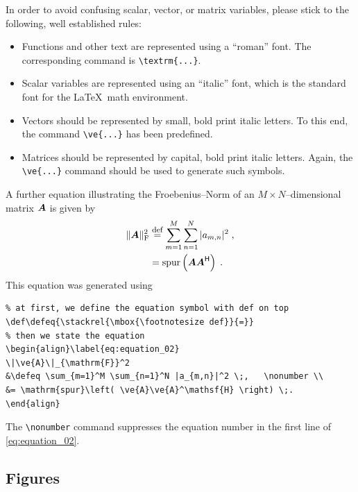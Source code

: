 \documentclass[12pt,a4paper,notitlepage,twoside,headsepline]{scrartcl}
\begin{document}
In order to avoid confusing scalar, vector, or matrix variables, please stick to the following, well established rules:
\begin{itemize}
	\item Functions and other text are represented using a ``roman'' font. The corresponding 			command is \verb|\textrm{...}|.
	\item Scalar variables are represented using an ``italic'' font, which is the standard font for 			the \LaTeX\ math environment.
	\item Vectors should be represented by small, bold print italic letters. To this end, the command 
	\verb|\ve{...}| has been predefined.
	\item Matrices should be represented by capital, bold print italic letters. Again, the \verb|\ve{...}|
	command should be used to generate such symbols.
\end{itemize}

A further equation illustrating the Froebenius--Norm of an $M\times N$--dimensional matrix $\ve{A}$ is given by
\def\defeq{\stackrel{\mbox{\footnotesize def}}{=}}	
\begin{align}\label{eq:equation_02}
\|\ve{A}\|_{\mathrm{F}}^2 &\defeq  \sum_{m=1}^M \sum_{n=1}^N |a_{m,n}|^2 \;,\nonumber \\
&= \mathrm{spur}\left( \ve{A}\ve{A}^\mathsf{H} \right) \;.
\end{align}
This equation was generated using
\begin{verbatim}
% at first, we define the equation symbol with def on top
\def\defeq{\stackrel{\mbox{\footnotesize def}}{=}}	
% then we state the equation
\begin{align}\label{eq:equation_02}
\|\ve{A}\|_{\mathrm{F}}^2 
&\defeq \sum_{m=1}^M \sum_{n=1}^N |a_{m,n}|^2 \;,	\nonumber \\
&= \mathrm{spur}\left( \ve{A}\ve{A}^\mathsf{H} \right) \;.
\end{align}
\end{verbatim}

The \verb+\nonumber+ command suppresses the equation number in the first line of \eqref{eq:equation_02}.

\subsection{Figures}
\end{document}
